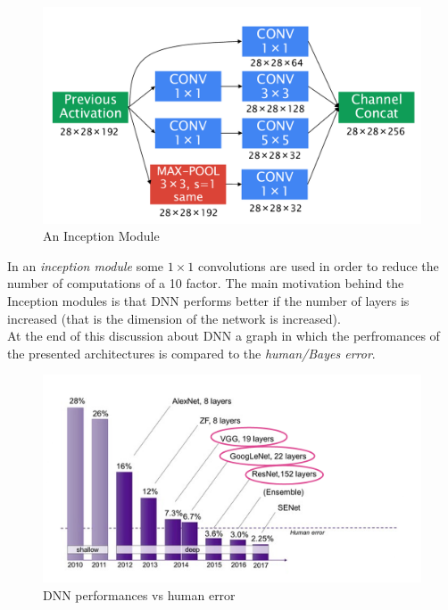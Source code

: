 \begin{figure}[h]
    \centering
    \includegraphics[scale=0.3]{img/InceptionModule.png}
    \caption{An Inception Module}
\end{figure}

\noindent
In an \textit{inception module} some $1{\times}{1}$ convolutions are used in order to reduce the number of computations of a 10 factor.
The main motivation behind the Inception modules is that DNN performs better if the number of layers is increased (that is the dimension of the network is increased).\\

\noindent
At the end of this discussion about DNN a graph in which the perfromances of the presented architectures is compared to the \textit{human/Bayes error}. 

\begin{figure}[h]
    \centering
    \includegraphics[scale=0.5]{img/PerfDNN.png}
    \caption{DNN performances vs human error}
\end{figure}

